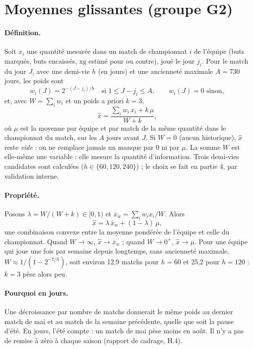 \section{Moyennes glissantes (groupe G2)}
\label{sec:glissants}

\paragraph{Définition.} Soit \(x_i\) une quantité mesurée dans un match de championnat \(i\) de
l'équipe (buts marqués, buts encaissés, \(\mathrm{xg}\) estimé pour ou contre), joué le jour
\(j_i\). Pour le match du jour \(J\), avec une demi-vie \(h\) (en jours) et une ancienneté maximale
\(A = 730\) jours, les poids sont
\[
  w_i(J) = 2^{-(J - j_i)/h} \quad \text{si } 1 \le J - j_i \le A, \qquad w_i(J) = 0 \text{ sinon},
\]
et, avec \(W = \sum_i w_i\) et un poids a priori \(k = 3\),
\[
  \hat{x} = \frac{\sum_i w_i\, x_i + k\, \mu}{W + k},
\]
où \(\mu\) est la moyenne par équipe et par match de la même quantité dans le championnat du
match, sur les \(A\) jours avant \(J\). Si \(W = 0\) (aucun historique), \(\hat{x}\) reste
\emph{vide} : on ne remplace jamais un manque par 0 ni par \(\mu\). La somme \(W\) est elle-même
une variable : elle mesure la quantité d'information. Trois demi-vies candidates sont calculées
(\(h \in \{60, 120, 240\}\)) ; le choix se fait en partie 4, par validation interne.

\paragraph{Propriété.} Posons \(\lambda = W/(W + k) \in [0, 1)\) et
\(\bar{x}_w = \sum_i w_i x_i / W\). Alors
\[
  \hat{x} = \lambda\, \bar{x}_w + (1 - \lambda)\, \mu,
\]
une combinaison convexe entre la moyenne pondérée de l'équipe et celle du championnat. Quand
\(W \to \infty\), \(\hat{x} \to \bar{x}_w\) ; quand \(W \to 0^{+}\), \(\hat{x} \to \mu\). Pour une
équipe qui joue une fois par semaine depuis longtemps, sans ancienneté maximale,
\(W \approx 1/(1 - 2^{-7/h})\), soit environ 12,9 matchs pour \(h = 60\) et 25,2 pour \(h = 120\) :
\(k = 3\) pèse alors peu.

\paragraph{Pourquoi en jours.} Une décroissance par nombre de matchs donnerait le même poids au
dernier match de mai et au match de la semaine précédente, quelle que soit la pause d'été. En
jours, l'été compte : un match de mai pèse moins en août. Il n'y a pas de remise à zéro à chaque
saison (rapport de cadrage, H.4).

